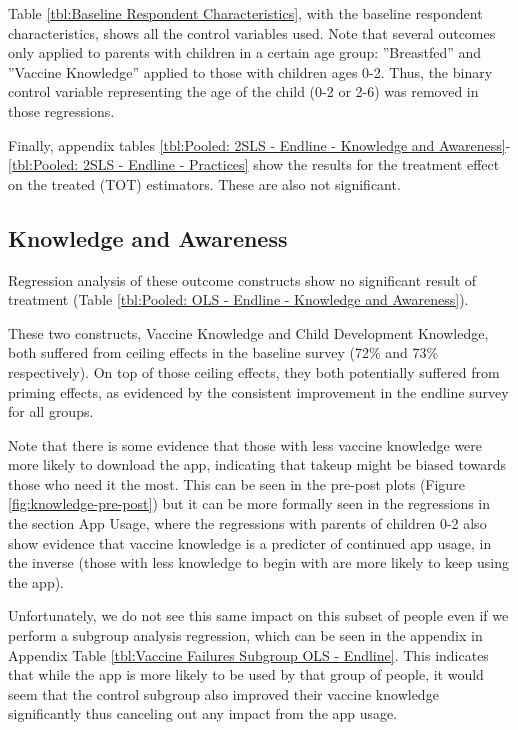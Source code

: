\documentclass{article}
\begin{document}
Table \ref{tbl:Baseline Respondent Characteristics}, with the baseline respondent characteristics, shows all the control variables used. Note that several outcomes only applied to parents with children in a certain age group: ”Breastfed” and ”Vaccine Knowledge” applied to those with children ages 0-2. Thus, the binary control variable representing the age of the child (0-2 or 2-6) was removed in those regressions.

Finally, appendix tables \ref{tbl:Pooled: 2SLS - Endline - Knowledge and Awareness}-\ref{tbl:Pooled: 2SLS - Endline - Practices} show the results for the treatment effect on the treated (TOT) estimators. These are also not significant.


\subsection{Knowledge and Awareness}

Regression analysis of these outcome constructs show no significant result of treatment (Table \ref{tbl:Pooled: OLS - Endline - Knowledge and Awareness}).



These two constructs, Vaccine Knowledge and Child Development Knowledge, both suffered from ceiling effects in the baseline survey (72\% and 73\% respectively). On top of those ceiling effects, they both potentially suffered from priming effects, as evidenced by the consistent improvement in the endline survey for all groups.

Note that there is some evidence that those with less vaccine knowledge were more likely to download the app, indicating that takeup might be biased towards those who need it the most. This can be seen in the pre-post plots (Figure \ref{fig:knowledge-pre-post}) but it can be more formally seen in the regressions in the section App Usage, where the regressions with parents of children 0-2 also show evidence that vaccine knowledge is a predicter of continued app usage, in the inverse (those with less knowledge to begin with are more likely to keep using the app).

Unfortunately, we do not see this same impact on this subset of people even if we perform a subgroup analysis regression, which can be seen in the appendix in Appendix Table \ref{tbl:Vaccine Failures Subgroup OLS - Endline}. This indicates that while the app is more likely to be used by that group of people, it would seem that the control subgroup also improved their vaccine knowledge significantly thus canceling out any impact from the app usage.
\end{document}
